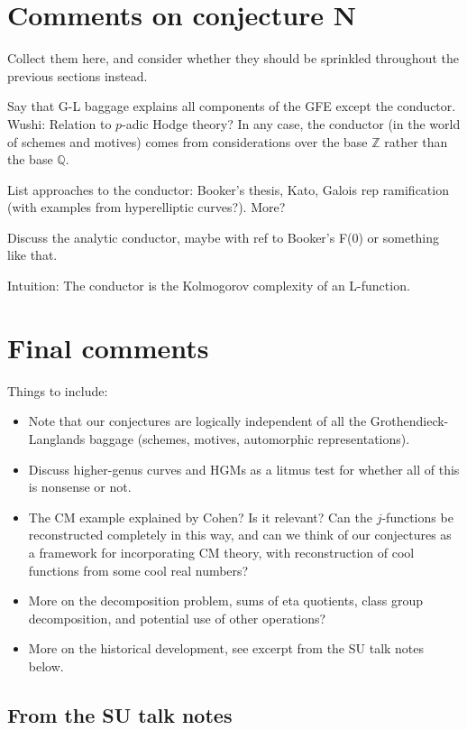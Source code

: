 \documentclass[paper=a4, fontsize=11pt]{scrartcl} %
\numberwithin{equation}{section} %
\numberwithin{figure}{section} %
\numberwithin{table}{section} %
\begin{document}
\section{Comments on conjecture N}

Collect them here, and consider whether they should be sprinkled throughout the previous sections instead.

Say that G-L baggage explains all components of the GFE except the conductor. Wushi: Relation to $p$-adic Hodge theory? In any case, the conductor (in the world of schemes and motives) comes from considerations over the base $\mathbb{Z}$ rather than the base $\mathbb{Q}$.

List approaches to the conductor: Booker's thesis, Kato, Galois rep ramification (with examples from hyperelliptic curves?). More?

Discuss the analytic conductor, maybe with ref to Booker's F(0) or something like that.

Intuition: The conductor is the Kolmogorov complexity of an L-function.

\section{Final comments}

Things to include:
\begin{itemize}
\item Note that our conjectures are logically independent of all the Grothendieck-Langlands baggage (schemes, motives, automorphic representations).
\item Discuss higher-genus curves and HGMs as a litmus test for whether all of this is nonsense or not.
\item The CM example explained by Cohen? Is it relevant? Can the $j$-functions be reconstructed completely in this way, and can we think of our conjectures as a framework for incorporating CM theory, with reconstruction of cool functions from some cool real numbers?
\item More on the decomposition problem, sums of eta quotients, class group decomposition, and potential use of other operations?
\item More on the historical development, see excerpt from the SU talk notes below.
\end{itemize}

\subsection*{From the SU talk notes}
\end{document}

